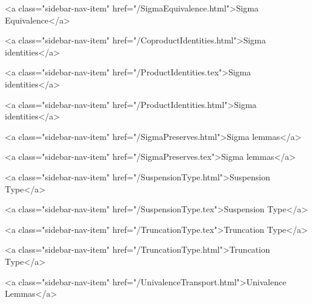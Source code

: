       
    
      
        
          <a class="sidebar-nav-item" href="/SigmaEquivalence.html">Sigma Equivalence</a>
        
      
    
      
        
          <a class="sidebar-nav-item" href="/CoproductIdentities.html">Sigma identities</a>
        
      
    
      
        
          <a class="sidebar-nav-item" href="/ProductIdentities.tex">Sigma identities</a>
        
      
    
      
        
          <a class="sidebar-nav-item" href="/ProductIdentities.html">Sigma identities</a>
        
      
    
      
        
          <a class="sidebar-nav-item" href="/SigmaPreserves.html">Sigma lemmas</a>
        
      
    
      
        
          <a class="sidebar-nav-item" href="/SigmaPreserves.tex">Sigma lemmas</a>
        
      
    
      
        
          <a class="sidebar-nav-item" href="/SuspensionType.html">Suspension Type</a>
        
      
    
      
        
          <a class="sidebar-nav-item" href="/SuspensionType.tex">Suspension Type</a>
        
      
    
      
        
          <a class="sidebar-nav-item" href="/TruncationType.tex">Truncation Type</a>
        
      
    
      
        
          <a class="sidebar-nav-item" href="/TruncationType.html">Truncation Type</a>
        
      
    
      
        
          <a class="sidebar-nav-item" href="/UnivalenceTransport.html">Univalence Lemmas</a>
        
